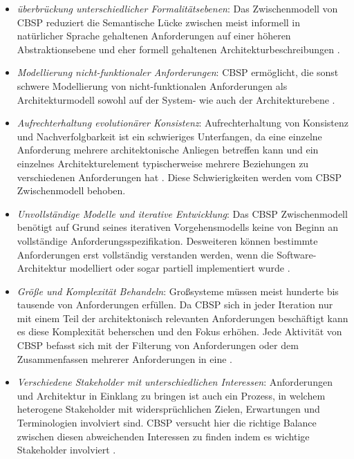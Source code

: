 \begin{itemize}
\item \textit{\"uberbr\"uckung unterschiedlicher Formalit\"atsebenen}: Das Zwischenmodell von CBSP reduziert die Semantische L\"ucke zwischen meist informell in nat\"urlicher Sprache gehaltenen Anforderungen auf einer h\"oheren Abstraktionsebene und eher formell gehaltenen Architekturbeschreibungen \cite{Gru01}.
\item \textit{Modellierung nicht-funktionaler Anforderungen}: CBSP erm\"oglicht, die sonst schwere Modellierung von nicht-funktionalen Anforderungen als Architekturmodell sowohl auf der System- wie auch der Architekturebene \cite{Gru01}. 
\item \textit{Aufrechterhaltung evolution\"arer Konsistenz}: Aufrechterhaltung von Konsistenz und Nachverfolgbarkeit ist ein schwieriges Unterfangen, da eine einzelne Anforderung mehrere architektonische Anliegen betreffen kann und ein einzelnes Architekturelement typischerweise mehrere Beziehungen zu verschiedenen Anforderungen hat \cite{Gru01}. Diese Schwierigkeiten werden vom CBSP Zwischenmodell behoben.
\item \textit{Unvollst\"andige Modelle und iterative Entwicklung}: Das CBSP Zwischenmodell ben\"otigt auf Grund seines iterativen Vorgehensmodells keine von Beginn an vollst\"andige Anforderungsspezifikation. Desweiteren k\"onnen bestimmte Anforderungen erst vollst\"andig verstanden werden, wenn die Software-Architektur modelliert oder sogar partiell implementiert wurde \cite{Gru01}.
\item \textit{Gr\"o\ss{}e und Komplexit\"at Behandeln}: Gro\ss{}systeme m\"ussen meist hunderte bis tausende von Anforderungen erf\"ullen. Da CBSP sich in jeder Iteration nur mit einem Teil der architektonisch relevanten Anforderungen besch\"aftigt kann es diese Komplexit\"at beherschen und den Fokus erh\"ohen. Jede Aktivit\"at von CBSP befasst sich mit der Filterung von Anforderungen oder dem Zusammenfassen mehrerer Anforderungen in eine \cite{Gru01}.
\item \textit{Verschiedene Stakeholder mit unterschiedlichen Interessen}: Anforderungen und Architektur in Einklang zu bringen ist auch ein Prozess, in welchem heterogene Stakeholder mit widerspr\"uchlichen Zielen, Erwartungen und Terminologien involviert sind. CBSP versucht hier die richtige Balance zwischen diesen abweichenden Interessen zu finden indem es wichtige Stakeholder involviert \cite{Gru01}. \\
\end{itemize}

